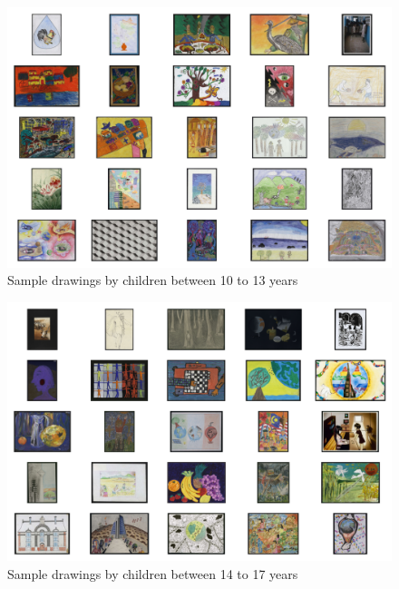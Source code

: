 \begin{figure}[ht]
\centering
\includegraphics[width=\textwidth]{images/sample_drawings/sample_drawings_10_13.png}
  \caption{Sample drawings by children between 10 to 13 years}
  \label{fig:drawing-10_13}
\end{figure}

\begin{figure}[ht]
\centering
\includegraphics[width=\textwidth]{images/sample_drawings/sample_drawings_14_17.png}
  \caption{Sample drawings by children between 14 to 17 years}
  \label{fig:drawing-14_17}
\end{figure}

